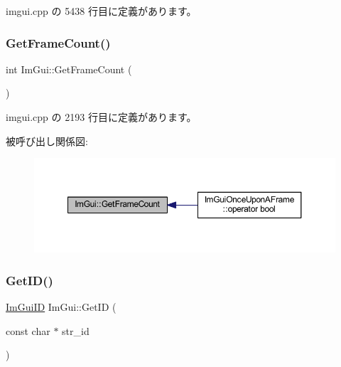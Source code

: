  imgui.\+cpp の 5438 行目に定義があります。

\mbox{\label{namespace_im_gui_a0180211f23fc10807dfc3d2f6e8681f9}} 
\subsubsection{\texorpdfstring{Get\+Frame\+Count()}{GetFrameCount()}}
{\footnotesize\ttfamily int Im\+Gui\+::\+Get\+Frame\+Count (\begin{DoxyParamCaption}{ }\end{DoxyParamCaption})}



 imgui.\+cpp の 2193 行目に定義があります。

被呼び出し関係図\+:\nopagebreak
\begin{figure}[H]
\begin{center}
\leavevmode
\includegraphics[width=350pt]{namespace_im_gui_a0180211f23fc10807dfc3d2f6e8681f9_icgraph}
\end{center}
\end{figure}
\mbox{\label{namespace_im_gui_a3329b04bd4235e90ad9deb00ffb38ae4}} 
\subsubsection{\texorpdfstring{Get\+I\+D()}{GetID()}\hspace{0.1cm}{\footnotesize\ttfamily [1/3]}}
{\footnotesize\ttfamily \mbox{\hyperlink{imgui_8h_a1785c9b6f4e16406764a85f32582236f}{Im\+Gui\+ID}} Im\+Gui\+::\+Get\+ID (\begin{DoxyParamCaption}\item[{const char $\ast$}]{str\+\_\+id }\end{DoxyParamCaption})}



